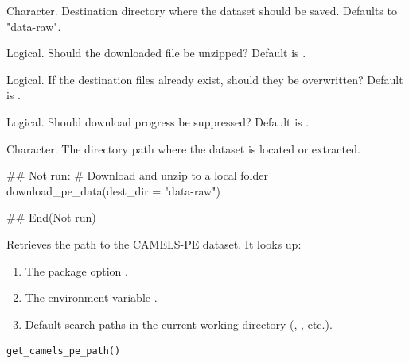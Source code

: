 \documentclass[a4paper]{book}
\begin{document}
%
\begin{Arguments}
\begin{ldescription}
\item[\code{dest\_dir}] Character. Destination directory where the dataset should be saved.
Defaults to "data-raw".

\item[\code{unzip}] Logical. Should the downloaded file be unzipped? Default is .

\item[\code{overwrite}] Logical. If the destination files already exist, should they be overwritten?
Default is .

\item[\code{quiet}] Logical. Should download progress be suppressed? Default is .
\end{ldescription}
\end{Arguments}
%
\begin{Value}
Character. The directory path where the dataset is located or extracted.
\end{Value}
%
\begin{Examples}
\begin{ExampleCode}
## Not run: 
# Download and unzip to a local folder
download_pe_data(dest_dir = "data-raw")

## End(Not run)
\end{ExampleCode}
\end{Examples}
%
\begin{Description}
Retrieves the path to the CAMELS-PE dataset. It looks up:
\begin{enumerate}

\item{} The package option .
\item{} The environment variable .
\item{} Default search paths in the current working directory (, , etc.).

\end{enumerate}

\end{Description}
%
\begin{Usage}
\begin{verbatim}
get_camels_pe_path()
\end{verbatim}
\end{Usage}
\end{document}
